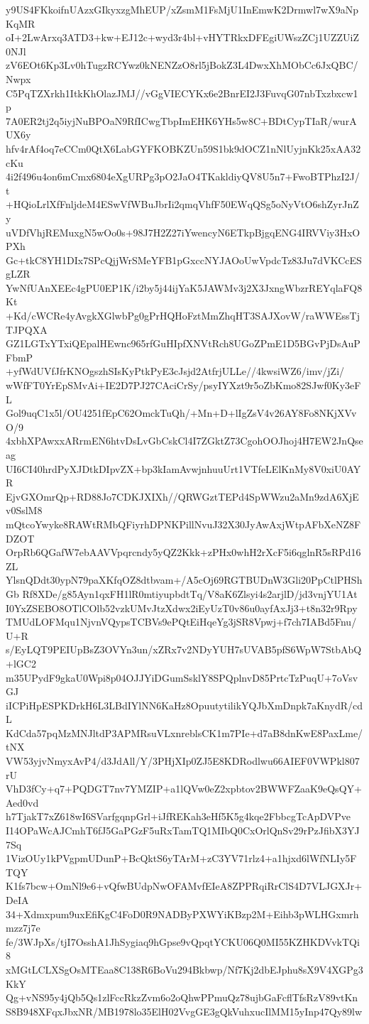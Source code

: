 y9US4FKkoifnUAzxGIkyxzgMhEUP/xZsmM1FsMjU1InEmwK2Drmwl7wX9aNpKqMR
oI+2LwArxq3ATD3+kw+EJ12c+wyd3r4bl+vHYTRkxDFEgiUWszZCj1UZZUiZ0NJl
zV6EOt6Kp3Lv0hTugzRCYwz0kNENZzO8rl5jBokZ3L4DwxXhMObCc6JxQBC/Nwpx
C5PqTZXrkh1ItkKhOlazJMJ//vGgVIECYKx6e2BnrEI2J3FuvqG07nbTxzbxcw1p
7A0ER2tj2q5iyjNuBPOaN9RfICwgTbpImEHK6YHs5w8C+BDtCypTIaR/wurAUX6y
hfv4rAf4oq7eCCm0QtX6LabGYFKOBKZUn59S1bk9dOCZ1nNlUyjnKk25xAA32cKu
4i2f496u4on6mCmx6804eXgURPg3pO2JaO4TKakldiyQV8U5n7+FwoBTPhzI2J/t
+HQioLrlXfFnljdeM4ESwVfWBuJbrIi2qmqVhfF50EWqQSg5oNyVtO6shZyrJnZy
uVDfVhjREMuxgN5wOo0s+98J7H2Z27iYwencyN6ETkpBjgqENG4IRVViy3HxOPXh
Gc+tkC8YH1DIx7SPcQjjWrSMeYFB1pGxccNYJAOoUwVpdcTz83Ju7dVKCcESgLZR
YwNfUAnXEEc4gPU0EP1K/i2by5j44ijYaK5JAWMv3j2X3JxngWbzrREYqlaFQ8Kt
+Kd/cWCRe4yAvgkXGlwbPg0gPrHQHoFztMmZhqHT3SAJXovW/raWWEssTjTJPQXA
GZ1LGTxYTxiQEpalHEwnc965rfGuHIpfXNVtRch8UGoZPmE1D5BGvPjDsAuPFbmP
+yfWdUVfJfrKNOgszhSIsKyPtkPyE3cJsjd2AtfrjULLe//4kwsiWZ6/imv/jZi/
wWfFT0YrEpSMvAi+IE2D7PJ27CAciCrSy/psyIYXzt9r5oZbKmo82SJwf0Ky3eFL
Gol9uqC1x5l/OU4251fEpC62OmckTuQh/+Mn+D+lIgZsV4v26AY8Fo8NKjXVvO/9
4xbhXPAwxxARrmEN6htvDsLvGbCskCl4I7ZGktZ73CgohOOJhoj4H7EW2JnQseag
UI6CI40hrdPyXJDtkDIpvZX+bp3kIamAvwjnhuuUrt1VTfeLElKnMy8V0xiU0AYR
EjvGXOmrQp+RD88Jo7CDKJXIXh//QRWGztTEPd4SpWWzu2aMn9zdA6XjEv0SslM8
mQtcoYwyke8RAWtRMbQFiyrhDPNKPillNvuJ32X30JyAwAxjWtpAFbXeNZ8FDZOT
OrpRb6QGafW7ebAAVVpqrcndy5yQZ2Kkk+zPHx0whH2rXcF5i6qglnR5sRPd16ZL
YlsnQDdt30ypN79paXKfqOZ8dtbvam+/A5cOj69RGTBUDnW3Gli20PpCtlPHShGb
Rf8XDe/g85Ayn1qxFH1lR0mtiyupbdtTq/V8aK6Zlsyi4s2arjlD/jd3vnjYU1At
I0YxZSEBO8OTlCOlb52vzkUMvJtzXdwx2iEyUzT0v86u0ayfAxJj3+t8n32r9Rpy
TMUdLOFMqu1NjvnVQypsTCBVs9ePQtEiHqeYg3jSR8Vpwj+f7ch7IABd5Fnu/U+R
s/EyLQT9PEIUpBsZ3OVYn3un/xZRx7v2NDyYUH7sUVAB5pfS6WpW7StbAbQ+lGC2
m35UPydF9gkaU0Wpi8p04OJJYiDGumSsklY8SPQplnvD85PrtcTzPuqU+7oVsvGJ
iICPiHpESPKDrkH6L3LBdIYlNN6KaHz8OpuutytilikYQJbXmDnpk7aKnydR/cdL
KdCda57pqMzMNJltdP3APMRsuVLxnreblsCK1m7PIe+d7aB8dnKwE8PaxLme/tNX
VW53yjvNmyxAvP4/d3JdAll/Y/3PHjXIp0ZJ5E8KDRodlwu66AIEF0VWPkl807rU
VhD3fCy+q7+PQDGT7nv7YMZIP+a1lQVw0eZ2xpbtov2BWWFZaaK9eQsQY+Aed0vd
h7TjakT7xZ618wI6SVarfgqnpGrl+iJfREKah3eHf5K5g4kqe2FbbcgTcApDVPve
I14OPaWcAJCmhT6fJ5GaPGzF5uRxTamTQ1MIbQ0CxOrlQnSv29rPzJfibX3YJ7Sq
1VizOUy1kPVgpmUDunP+BcQktS6yTArM+zC3YV71rlz4+a1hjxd6lWfNLIy5FTQY
K1fs7bcw+OmNl9e6+vQfwBUdpNwOFAMvfEIeA8ZPPRqiRrClS4D7VLJGXJr+DeIA
34+Xdmxpum9uxEfiKgC4FoD0R9NADByPXWYiKBzp2M+Eihb3pWLHGxmrhmzz7j7e
fe/3WJpXs/tjI7OsshA1JhSygiaq9hGpse9vQpqtYCKU06Q0MI55KZHKDVvkTQi8
xMGtLCLXSgOsMTEaa8C138R6BoVu294Bkbwp/Nf7Kj2dbEJphu8sX9V4XGPg3KkY
Qg+vNS95y4jQb5Qs1zlFccRkzZvm6o2oQhwPPmuQz78ujbGaFcflTfsRzV89vtKn
S8B948XFqxJbxNR/MB1978lo35ElH02VvgGE3gQkVuhxucIlMM15yInp47Qy89lw
